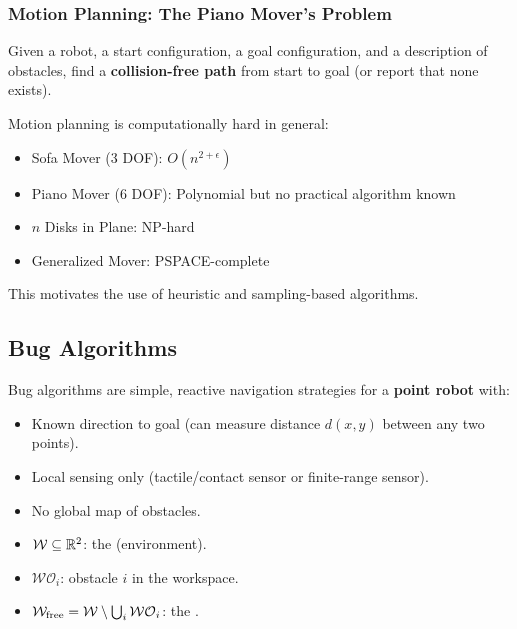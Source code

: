 \separator

\subsubsection{Motion Planning: The Piano Mover's Problem}

\begin{defbox}
Given a robot, a start configuration, a goal configuration, and a description of obstacles, find a \textbf{collision-free path} from start to goal (or report that none exists).
\end{defbox}

\begin{tipbox}
Motion planning is computationally hard in general:
\begin{itemize}
  \item Sofa Mover (3 DOF): $O(n^{2+\epsilon})$
  \item Piano Mover (6 DOF): Polynomial but no practical algorithm known
  \item $n$ Disks in Plane: NP-hard
  \item Generalized Mover: PSPACE-complete
\end{itemize}
This motivates the use of heuristic and sampling-based algorithms.
\end{tipbox}

\bigseparator

\subsection{Bug Algorithms}

Bug algorithms are simple, reactive navigation strategies for a \textbf{point robot} with:
\begin{itemize}
  \item Known direction to goal (can measure distance $d(x, y)$ between any two points).
  \item Local sensing only (tactile/contact sensor or finite-range sensor).
  \item No global map of obstacles.
\end{itemize}

\begin{defbox}
\begin{itemize}
  \item $\mathcal{W} \subseteq \mathbb{R}^2$: the  (environment).
  \item $\mathcal{WO}_i$: obstacle $i$ in the workspace.
  \item $\mathcal{W}_{\text{free}} = \mathcal{W} \setminus \bigcup_i \mathcal{WO}_i$: the .
\end{itemize}
\end{defbox}


